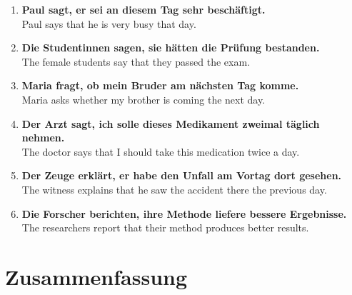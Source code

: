 \documentclass[a4paper,11pt]{article}
\begin{document}
        \begin{exbox}
            \begin{enumerate}
                \item \textbf{Paul sagt, er sei an diesem Tag sehr beschäftigt.}\\
                {\small\color{SoftGray}Paul says that he is very busy that day.}

                \item \textbf{Die Studentinnen sagen, sie hätten die Prüfung bestanden.}\\
                {\small\color{SoftGray}The female students say that they passed the exam.}

                \item \textbf{Maria fragt, ob mein Bruder am nächsten Tag komme.}\\
                {\small\color{SoftGray}Maria asks whether my brother is coming the next day.}

                \item \textbf{Der Arzt sagt, ich solle dieses Medikament zweimal täglich nehmen.}\\
                {\small\color{SoftGray}The doctor says that I should take this medication twice a day.}

                \item \textbf{Der Zeuge erklärt, er habe den Unfall am Vortag dort gesehen.}\\
                {\small\color{SoftGray}The witness explains that he saw the accident there the previous day.}

                \item \textbf{Die Forscher berichten, ihre Methode liefere bessere Ergebnisse.}\\
                {\small\color{SoftGray}The researchers report that their method produces better results.}
            \end{enumerate}
        \end{exbox}


    \section{Zusammenfassung}
\end{document}
